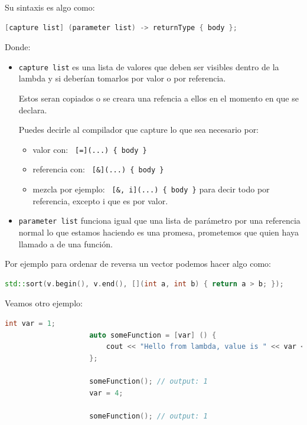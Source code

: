 \documentclass[12pt, fleqn]{report}                             %
\theoremstyle{break}                                            %
\newcommand{\textCode}[1]  { \texttt{#1} }                      %
\begin{document}
                Su sintaxis es algo como:
                \begin{lstlisting}[language=C++, gobble=20]
                    [capture list] (parameter list) -> returnType { body };
                \end{lstlisting} 

                Donde:
                \begin{itemize}
                    \item \textCode{capture list} es una lista de valores que deben ser visibles dentro
                        de la lambda y si deberían tomarlos por valor o por referencia.

                        Estos seran copiados o se creara una refencia a ellos en el momento en que se
                        declara.

                        Puedes decirle al compilador que capture lo que sea necesario por:
                        \begin{itemize}
                            \item valor con: \textCode{ [=](...) \{ body \}}
                            \item referencia con: \textCode{ [\&](...) \{ body \}}
                            \item mezcla  por ejemplo: \textCode{ [\&, i](...) \{ body \}} 
                            \; para decir todo por referencia, excepto i que es por valor. 
                        \end{itemize}

                        
                    \item \textCode{parameter list} funciona igual que una lista de parámetro por una referencia normal
                    lo que estamos haciendo es una promesa, prometemos que quien haya llamado a  
                        de una función.
                \end{itemize}

                Por ejemplo para ordenar de reversa un vector podemos hacer algo como:
                \begin{lstlisting}[language=C++, gobble=20]
                    std::sort(v.begin(), v.end(), [](int a, int b) { return a > b; });
                \end{lstlisting}
                
                Veamos otro ejemplo:
                \begin{lstlisting}[language=C++, gobble=20]
                    int var = 1;
                    auto someFunction = [var] () { 
                        cout << "Hello from lambda, value is " << var << endl;
                    };

                    someFunction(); // output: 1
                    var = 4;

                    someFunction(); // output: 1
                \end{lstlisting}
\end{document}
